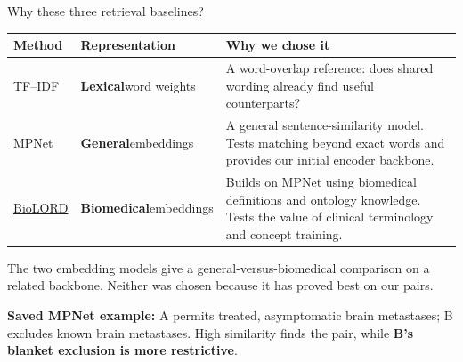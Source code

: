 \documentclass[aspectratio=169,11pt]{beamer}
\newcommand{\gap}{\par\vspace{.55em}}
\begin{document}
\begin{frame}{Why these three retrieval baselines?}
\begingroup\small
\begin{tabularx}{\textwidth}{@{}p{}p{}Y@{}}
\toprule
Method & Representation & Why we chose it\\\midrule
TF--IDF & \textbf{Lexical}\newline word weights & A word-overlap reference: does shared wording already find useful counterparts?\\
\href{https://huggingface.co/sentence-transformers/all-mpnet-base-v2}{MPNet} & \textbf{General}\newline embeddings & A general sentence-similarity model. Tests matching beyond exact words and provides our initial encoder backbone.\\
\href{https://huggingface.co/FremyCompany/BioLORD-2023}{BioLORD} & \textbf{Biomedical}\newline embeddings & Builds on MPNet using biomedical definitions and ontology knowledge. Tests the value of clinical terminology and concept training.\\\bottomrule
\end{tabularx}
\endgroup
\gap
The two embedding models give a general-versus-biomedical comparison on a
related backbone. Neither was chosen because it has proved best on our pairs.
\gap
\textbf{Saved MPNet example:} A permits treated, asymptomatic brain metastases;
B excludes known brain metastases. High similarity finds the pair, while
\textbf{B's blanket exclusion is more restrictive}.
\end{frame}
\end{document}
